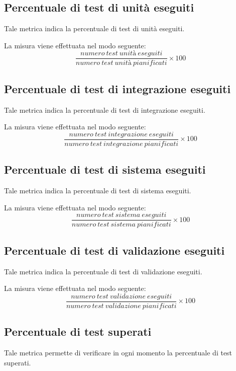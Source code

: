 \subsection{Percentuale di test di unità eseguiti}
Tale metrica indica la percentuale di test di unità eseguiti.

La misura viene effettuata nel modo seguente:
\begin{equation}
	\frac{numero~test~unità~eseguiti}{numero~test~unità~pianificati}\times100
\end{equation}

\subsection{Percentuale di test di integrazione eseguiti}
Tale metrica indica la percentuale di test di integrazione eseguiti.

La misura viene effettuata nel modo seguente:
\begin{equation}
	\frac{numero~test~integrazione~eseguiti}{numero~test~integrazione~pianificati}\times100
\end{equation}

\subsection{Percentuale di test di sistema eseguiti}
Tale metrica indica la percentuale di test di sistema eseguiti.

La misura viene effettuata nel modo seguente:
\begin{equation}
	\frac{numero~test~sistema~eseguiti}{numero~test~sistema~pianificati}\times100
\end{equation}

\subsection{Percentuale di test di validazione eseguiti}
Tale metrica indica la percentuale di test di validazione eseguiti.

La misura viene effettuata nel modo seguente:
\begin{equation}
	\frac{numero~test~validazione~eseguiti}{numero~test~validazione~pianificati}\times100
\end{equation}

\subsection{Percentuale di test superati}
Tale metrica permette di verificare in ogni momento la percentuale di test superati.

